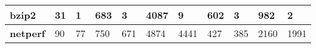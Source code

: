 \documentclass[10pt]{report}
\begin{document}
\begin{table}[]
{\begin{tabular}{|l|l|l|l|l|l|l|l|l|l|l|}
{\color[HTML]{24292E} \textbf{bzip2}}                        & 31                             & 1                             & 683                              & 3                              & 4087                             & 9                              & 602                               & 3                               & 982                                  & 2                                   \\ \hline
{\color[HTML]{24292E} \textbf{netperf}}                      & 90                             & 77                            & 750                              & 671                            & 4874                             & 4441                           & 427                               & 385                             & 2160                                 & 1991                                \\ \hline
\end{tabular}%
}
\end{table}



\end{document}
